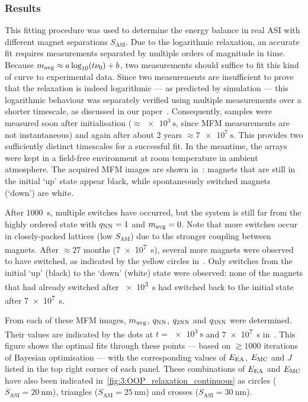 \subsubsection{Results} 
This fitting procedure was used to determine the energy balance in real ASI with different magnet separations $S_\mathrm{ASI}$.
Due to the logarithmic relaxation, an accurate fit requires measurements separated by multiple orders of magnitude in time.
Because $\mavg \approx a \log_{10}(t \nu_0) + b$, two measurements should suffice to fit this kind of curve to experimental data.
Since two measurements are insufficient to prove that the relaxation is indeed logarithmic --- as predicted by simulation --- this logarithmic behaviour was separately verified using multiple measurements over a shorter timescale, as discussed in our paper~\cite[Supp. 5.4]{KUR-24}.
Consequently, samples were measured soon after initialisation ($\approx \SI{e3}{\second}$, since MFM measurements are not instantaneous) and again after about 2 years $\approx \SI{7e7}{\second}$.
This provides two sufficiently distinct timescales for a successful fit.
In the meantime, the arrays were kept in a field-free environment at room temperature in ambient atmosphere.
The acquired MFM images are shown in~: magnets that are still in the initial `up' state appear black, while spontaneously switched magnets (`down') are white. \par
After \SI{1000}{\second}, multiple switches have occurred, but the system is still far from the highly ordered state with $\qNN=1$ and $\mavg=0$.
Note that more switches occur in closely-packed lattices (low $S_\mathrm{ASI}$) due to the stronger coupling between magnets.
After $\approx 27$ months (\SI{7e7}{\second}), several more magnets were observed to have switched, as indicated by the yellow circles in~.
Only switches from the initial `up' (black) to the `down' (white) state were observed: none of the magnets that had already switched after \SI{e3}{\second} had switched back to the initial state after \SI{7e7}{\second}. \par
From each of these MFM images, $\mavg$, $\qNN$, $\qNN[2]$ and $\qNN[3]$ were determined.
Their values are indicated by the dots at $t=\SI{e3}{\second}$ and \SI{7e7}{\second} in~.
This figure shows the optimal fits through these points --- based on $\gtrsim 1000$ iterations of Bayesian optimisation --- with the corresponding values of $\EEA$, $\EMC$ and $J$ listed in the top right corner of each panel.
These combinations of $\EEA$ and $\EMC$ have also been indicated in~\cref{fig:3:OOP_relaxation_continuous} as circles ($S_\mathrm{ASI}=\SI{20}{\nano\metre}$), triangles ($S_\mathrm{ASI}=\SI{25}{\nano\metre}$) and crosses ($S_\mathrm{ASI}=\SI{30}{\nano\metre}$).

